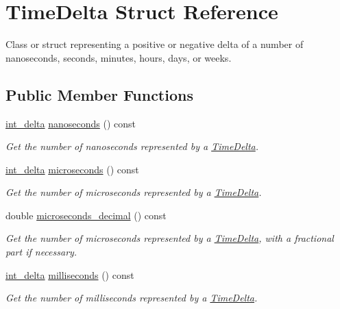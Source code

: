 \hypertarget{structTimeDelta}{\section{Time\-Delta Struct Reference}
\label{structTimeDelta}
}


Class or struct representing a positive or negative delta of a number of nanoseconds, seconds, minutes, hours, days, or weeks.  


\subsection*{Public Member Functions}
\begin{DoxyCompactItemize}
\item 
\hyperlink{types_8h_a8a67cf99971c5cfeeaa2380ba84a4c92}{int\-\_\-delta} \hyperlink{structTimeDelta_a27608357ea9addd1d0da20918f91d500}{nanoseconds} () const 
\begin{DoxyCompactList}\small\item\em Get the number of nanoseconds represented by a \hyperlink{structTimeDelta}{Time\-Delta}. \end{DoxyCompactList}\item 
\hyperlink{types_8h_a8a67cf99971c5cfeeaa2380ba84a4c92}{int\-\_\-delta} \hyperlink{structTimeDelta_aa23b22a3b2a0f3f559e9dc343588b546}{microseconds} () const 
\begin{DoxyCompactList}\small\item\em Get the number of microseconds represented by a \hyperlink{structTimeDelta}{Time\-Delta}. \end{DoxyCompactList}\item 
double \hyperlink{structTimeDelta_a44f7ddea28b3ca359d4cc3b1907fdf00}{microseconds\-\_\-decimal} () const 
\begin{DoxyCompactList}\small\item\em Get the number of microseconds represented by a \hyperlink{structTimeDelta}{Time\-Delta}, with a fractional part if necessary. \end{DoxyCompactList}\item 
\hyperlink{types_8h_a8a67cf99971c5cfeeaa2380ba84a4c92}{int\-\_\-delta} \hyperlink{structTimeDelta_a185b2278844ed43b2f5e1e8d16b11cb2}{milliseconds} () const 
\begin{DoxyCompactList}\small\item\em Get the number of milliseconds represented by a \hyperlink{structTimeDelta}{Time\-Delta}. \end{DoxyCompactList}\item 

\end{DoxyCompactItemize}
